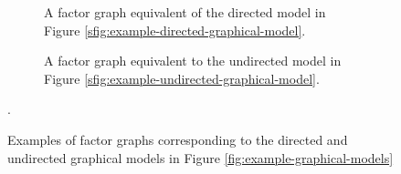 \begin{figure}[!h]
\centering
\begin{subfigure}[b]{.45\linewidth}
\vskip 0pt
\centering
{}
\caption{A factor graph equivalent of the directed model in Figure \ref{sfig:example-directed-graphical-model}.}
\label{sfig:example-directed-factor-graph}
\end{subfigure}%
 \hspace*{\fill}
\begin{subfigure}[b]{.45\linewidth}
\vskip 0pt
\centering
{}
\caption{A factor graph equivalent to the undirected model in Figure \ref{sfig:example-undirected-graphical-model}.}
\label{sfig:example-undirected-factor-graph}
\end{subfigure}%
\caption[Factor graph examples.]{Examples of factor graphs corresponding to the directed and undirected graphical models in Figure \ref{fig:example-graphical-models}}.
\label{fig:example-factor-graphs}
\end{figure}

